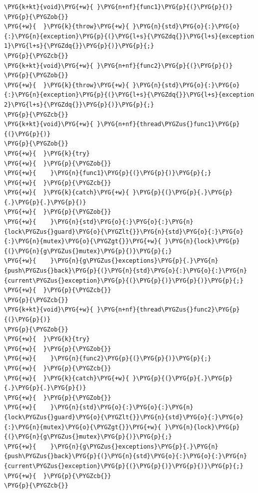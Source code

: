 \begin{codeblockbg}
\begin{Verbatim}[commandchars=\\\{\},breaklines=true,breakanywhere=true,fontsize=\codefont,xleftmargin=17bp]
\PYG{k+kt}{void}\PYG{+w}{ }\PYG{n+nf}{func1}\PYG{p}{(}\PYG{p}{)}
\PYG{p}{\PYGZob{}}
\PYG{+w}{  }\PYG{k}{throw}\PYG{+w}{ }\PYG{n}{std}\PYG{o}{:}\PYG{o}{:}\PYG{n}{exception}\PYG{p}{(}\PYG{l+s}{\PYGZdq{}}\PYG{l+s}{exception 1}\PYG{l+s}{\PYGZdq{}}\PYG{p}{)}\PYG{p}{;}
\PYG{p}{\PYGZcb{}}
\PYG{k+kt}{void}\PYG{+w}{ }\PYG{n+nf}{func2}\PYG{p}{(}\PYG{p}{)}
\PYG{p}{\PYGZob{}}
\PYG{+w}{  }\PYG{k}{throw}\PYG{+w}{ }\PYG{n}{std}\PYG{o}{:}\PYG{o}{:}\PYG{n}{exception}\PYG{p}{(}\PYG{l+s}{\PYGZdq{}}\PYG{l+s}{exception 2}\PYG{l+s}{\PYGZdq{}}\PYG{p}{)}\PYG{p}{;}
\PYG{p}{\PYGZcb{}}
\PYG{k+kt}{void}\PYG{+w}{ }\PYG{n+nf}{thread\PYGZus{}func1}\PYG{p}{(}\PYG{p}{)}
\PYG{p}{\PYGZob{}}
\PYG{+w}{  }\PYG{k}{try}
\PYG{+w}{  }\PYG{p}{\PYGZob{}}
\PYG{+w}{    }\PYG{n}{func1}\PYG{p}{(}\PYG{p}{)}\PYG{p}{;}
\PYG{+w}{  }\PYG{p}{\PYGZcb{}}
\PYG{+w}{  }\PYG{k}{catch}\PYG{+w}{ }\PYG{p}{(}\PYG{p}{.}\PYG{p}{.}\PYG{p}{.}\PYG{p}{)}
\PYG{+w}{  }\PYG{p}{\PYGZob{}}
\PYG{+w}{    }\PYG{n}{std}\PYG{o}{:}\PYG{o}{:}\PYG{n}{lock\PYGZus{}guard}\PYG{o}{\PYGZlt{}}\PYG{n}{std}\PYG{o}{:}\PYG{o}{:}\PYG{n}{mutex}\PYG{o}{\PYGZgt{}}\PYG{+w}{ }\PYG{n}{lock}\PYG{p}{(}\PYG{n}{g\PYGZus{}mutex}\PYG{p}{)}\PYG{p}{;}
\PYG{+w}{    }\PYG{n}{g\PYGZus{}exceptions}\PYG{p}{.}\PYG{n}{push\PYGZus{}back}\PYG{p}{(}\PYG{n}{std}\PYG{o}{:}\PYG{o}{:}\PYG{n}{current\PYGZus{}exception}\PYG{p}{(}\PYG{p}{)}\PYG{p}{)}\PYG{p}{;}
\PYG{+w}{  }\PYG{p}{\PYGZcb{}}
\PYG{p}{\PYGZcb{}}
\PYG{k+kt}{void}\PYG{+w}{ }\PYG{n+nf}{thread\PYGZus{}func2}\PYG{p}{(}\PYG{p}{)}
\PYG{p}{\PYGZob{}}
\PYG{+w}{  }\PYG{k}{try}
\PYG{+w}{  }\PYG{p}{\PYGZob{}}
\PYG{+w}{    }\PYG{n}{func2}\PYG{p}{(}\PYG{p}{)}\PYG{p}{;}
\PYG{+w}{  }\PYG{p}{\PYGZcb{}}
\PYG{+w}{  }\PYG{k}{catch}\PYG{+w}{ }\PYG{p}{(}\PYG{p}{.}\PYG{p}{.}\PYG{p}{.}\PYG{p}{)}
\PYG{+w}{  }\PYG{p}{\PYGZob{}}
\PYG{+w}{    }\PYG{n}{std}\PYG{o}{:}\PYG{o}{:}\PYG{n}{lock\PYGZus{}guard}\PYG{o}{\PYGZlt{}}\PYG{n}{std}\PYG{o}{:}\PYG{o}{:}\PYG{n}{mutex}\PYG{o}{\PYGZgt{}}\PYG{+w}{ }\PYG{n}{lock}\PYG{p}{(}\PYG{n}{g\PYGZus{}mutex}\PYG{p}{)}\PYG{p}{;}
\PYG{+w}{    }\PYG{n}{g\PYGZus{}exceptions}\PYG{p}{.}\PYG{n}{push\PYGZus{}back}\PYG{p}{(}\PYG{n}{std}\PYG{o}{:}\PYG{o}{:}\PYG{n}{current\PYGZus{}exception}\PYG{p}{(}\PYG{p}{)}\PYG{p}{)}\PYG{p}{;}
\PYG{+w}{  }\PYG{p}{\PYGZcb{}}
\PYG{p}{\PYGZcb{}}
\end{Verbatim}
\end{codeblockbg}


